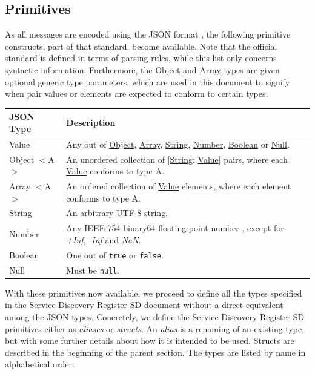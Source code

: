 \documentclass[a4paper]{arrowhead}
\newcommand{\pdef}[1]{{\textcolor{ArrowheadGrey}{#1 \label{sec:model:primitives:#1} \label{sec:model:primitives:#1s}}}}
\newcommand{\pref}[1]{{\textcolor{ArrowheadGrey}{\hyperref[sec:model:primitives:#1]{#1}}}}
\begin{document}
\subsection{Primitives}
\label{sec:model:primitives}

As all messages are encoded using the JSON format \cite{bray2014json}, the following primitive constructs, part of that standard, become available.
Note that the official standard is defined in terms of parsing rules, while this list only concerns syntactic information.
Furthermore, the \pref{Object} and \pref{Array} types are given optional generic type parameters, which are used in this document to signify when pair values or elements are expected to conform to certain types. 

\begin{table}[ht!]
\begin{tabularx}{\textwidth}{| p{3cm} | X |} \hline
\rowcolor{gray!33} JSON Type & Description \\ \hline
\pdef{Value}                 & Any out of \pref{Object}, \pref{Array}, \pref{String}, \pref{Number}, \pref{Boolean} or \pref{Null}. \\ \hline
\pdef{Object}$<$A$>$         & An unordered collection of $[$\pref{String}: \pref{Value}$]$ pairs, where each \pref{Value} conforms to type A. \\ \hline
\pdef{Array}$<$A$>$          & An ordered collection of \pref{Value} elements, where each element conforms to type A. \\ \hline
\pdef{String}                & An arbitrary UTF-8 string. \\ \hline
\pdef{Number}                & Any IEEE 754 binary64 floating point number \cite{cowlishaw2019floating}, except for \textit{+Inf}, \textit{-Inf} and \textit{NaN}. \\ \hline
\pdef{Boolean}               & One out of \texttt{true} or \texttt{false}. \\ \hline
\pdef{Null}                  & Must be \texttt{null}. \\ \hline
\end{tabularx}
\end{table}

With these primitives now available, we proceed to define all the types specified in the Service Discovery Register SD document without a direct equivalent among the JSON types.
Concretely, we define the Service Discovery Register SD primitives either as \textit{aliases} or \textit{structs}.
An \textit{alias} is a renaming of an existing type, but with some further details about how it is intended to be used.
Structs are described in the beginning of the parent section.
The types are listed by name in alphabetical order.
\end{document}
